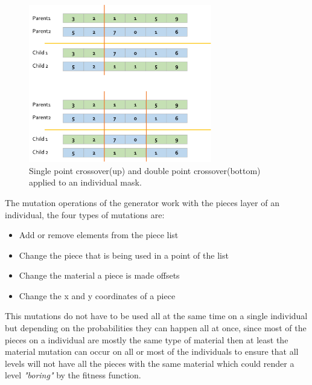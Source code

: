 \documentclass[conference]{IEEEtran}
\begin{document}
    \begin{figure}[htbp]
        \centerline{\includegraphics[width=80mm]{Images/crossover.png}}
        \caption{Single point crossover(up) and double point crossover(bottom) applied to an individual mask.}
        \label{crossover}
    \end{figure}
    
    The mutation operations of the generator work with the pieces layer of an
    individual, the four types of mutations are:
    
    \begin{itemize}
        \item Add or remove elements from the piece list
        \item Change the piece that is being used in a point of the list
        \item Change the material a piece is made offsets
        \item Change the x and y coordinates of a piece
    \end{itemize}
    
    This mutations do not have to be used all at the same time on a single
    individual but depending on the probabilities they can happen all at once,
    since most of the pieces on a individual are mostly the same type of
    material then at least the material mutation can occur on all or most of
    the individuals to ensure that all levels will not have all the pieces with
    the same material which could render a level \textit{"boring"} by the
    fitness function.
    
\end{document}
